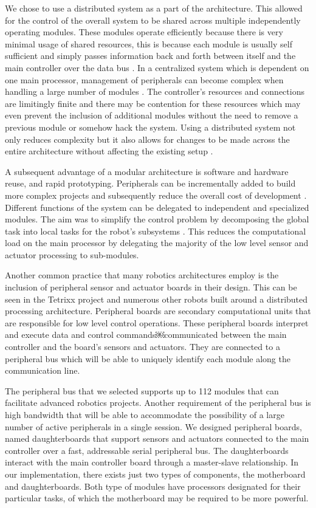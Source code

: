 We chose to use a distributed system as a part of the architecture. This allowed for the control of the overall system to be shared across multiple independently operating modules. These modules operate efficiently because there is very minimal usage of shared resources, this is because each module is usually self sufficient and simply passes information back and forth between itself and the main controller over the data bus \parencite{show figure}. In a centralized system which is dependent on one main processor, management of peripherals can become complex when handling a large number of modules \parencite{centralized figure}. The controller's resources and connections are limitingly finite and there may be contention for these resources which may even prevent the inclusion of additional modules without the need to remove a previous module or somehow hack the system.  Using a distributed system not only reduces complexity but it also allows for changes to be made across the entire architecture without affecting the existing setup \parencite{avcithesis}.

A subsequent advantage of a modular architecture is software and hardware reuse, and rapid prototyping. Peripherals can be incrementally added to build more complex projects and subsequently reduce the overall cost of development \parencite{modcom}. Different functions of the system can be delegated to independent and specialized modules. The aim was to simplify the control problem by decomposing the global task into local tasks for the robot's subsystems \parencite{paper[6]}. This reduces the computational load on the main processor by delegating the majority of the low level sensor and actuator processing to sub-modules. 

Another common practice that many robotics architectures employ is the inclusion of peripheral sensor and actuator boards in their design. This can be seen in the Tetrixx project \parencite{tetrixx} and numerous other robots built around a distributed processing architecture. Peripheral boards are secondary computational units that are responsible for low level control operations. These peripheral boards interpret and execute data and control commands￼communicated between the main controller and the board's sensors and actuators. They are connected to a peripheral bus which will be able to uniquely identify each module along the communication line. 

The peripheral bus that we selected supports up to 112 modules that can facilitate advanced robotics projects. Another requirement of the peripheral bus is high bandwidth that will be able to accommodate the possibility of a large number of active peripherals in a single session. We designed peripheral boards, named daughterboards that support sensors and actuators connected to the main controller over a fast, addressable serial peripheral bus. The daughterboards interact with the main controller board through a master-slave relationship. In our implementation, there exists just two types of components, the motherboard and daughterboards. Both type of modules have processors designated for their particular tasks, of which the motherboard may be required to be more powerful.


